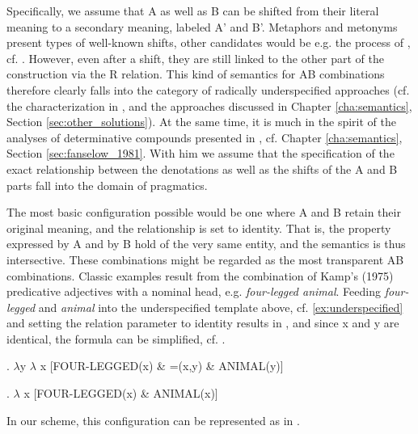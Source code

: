 Specifically, we assume that
A as well as B can be shifted from their literal meaning to a
secondary meaning, labeled A' and B'. 
Metaphors and metonyms present
types of well-known shifts, other candidates would be e.g. the process
of , cf. \citet{Bierwisch:1982}.
However, even after a shift,
they are still linked to the other part of the construction via the R
relation. This kind of semantics for AB combinations therefore clearly falls
into the category of radically underspecified approaches (cf. the
characterization in \citealt[128]{Blutner:1998}, and the approaches discussed in Chapter \ref{cha:semantics}, Section \ref{sec:other_solutions}). 
At the same time, it is
much in the spirit of the analyses of determinative compounds presented in \citet{Fanselow:1981}, cf. Chapter \ref{cha:semantics}, Section \ref{sec:fanselow_1981}. With him we assume
that the specification of the exact relationship between the
denotations as well as the shifts of the A and B parts fall into the
domain of pragmatics. 

\newpage
The most basic configuration possible would be one where A and B
retain their original meaning, and the relationship is set to
identity. That is, the property expressed by A and by B hold of the
very same entity, and the semantics is thus intersective. 
These combinations might be regarded as the most
transparent AB combinations. Classic examples result from the combination of
Kamp's (1975) predicative adjectives with a nominal head,
e.g. \emph{four-legged animal}. Feeding \emph{four-legged} and
\emph{animal} into the underspecified template above,
cf. \ref{ex:underspecified} and setting the relation parameter to
identity results in \Next, and since x and y are
identical, the formula can be simplified, cf. \NNext.

\ex. \label{ex:four-legged_underspecified}
$\lambda$y $\lambda$ x [FOUR-LEGGED(x) \& =(x,y) \& ANIMAL(y)]

\ex. \label{ex:four-legged_simplified}
$\lambda$ x [FOUR-LEGGED(x) \& ANIMAL(x)]

In our scheme, this configuration can be represented as in .

